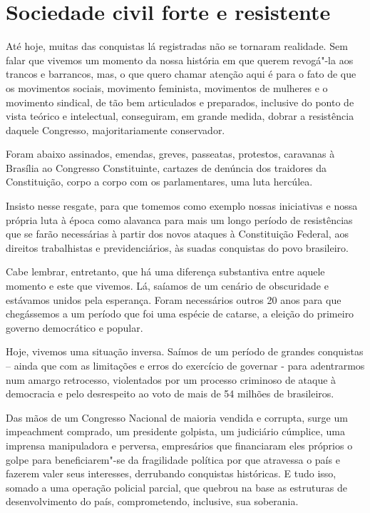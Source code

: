 \section{Sociedade civil forte e resistente}

Até hoje, muitas das conquistas lá registradas não se tornaram
realidade. Sem falar que vivemos um momento da nossa história em que
querem revogá"-la aos trancos e barrancos, mas, o que quero chamar
atenção aqui é para o fato de que os movimentos sociais, movimento
feminista, movimentos de mulheres e o movimento sindical, de tão bem
articulados e preparados, inclusive do ponto de vista teórico e
intelectual, conseguiram, em grande medida, dobrar a resistência daquele
Congresso, majoritariamente conservador.

Foram abaixo assinados, emendas, greves, passeatas, protestos, caravanas
à Brasília ao Congresso Constituinte, cartazes de denúncia dos traidores
da Constituição, corpo a corpo com os parlamentares, uma luta hercúlea.

Insisto nesse resgate, para que tomemos como exemplo nossas iniciativas
e nossa própria luta à época como alavanca para mais um longo período de
resistências que se farão necessárias à partir dos novos ataques à
Constituição Federal, aos direitos trabalhistas e previdenciários, às
suadas conquistas do povo brasileiro.

Cabe lembrar, entretanto, que há uma diferença substantiva entre aquele
momento e este que vivemos. Lá, saíamos de um cenário de obscuridade e
estávamos unidos pela esperança. Foram necessários outros 20 anos para
que chegássemos a um período que foi uma espécie de catarse, a eleição
do primeiro governo democrático e popular.

Hoje, vivemos uma situação inversa. Saímos de um período de grandes
conquistas -- ainda que com as limitações e erros do exercício de
governar - para adentrarmos num amargo retrocesso, violentados por um
processo criminoso de ataque à democracia e pelo desrespeito ao voto de
mais de 54 milhões de brasileiros.

Das mãos de um Congresso Nacional de maioria vendida e corrupta, surge
um impeachment comprado, um presidente golpista, um judiciário cúmplice,
uma imprensa manipuladora e perversa, empresários que financiaram eles
próprios o golpe para beneficiarem"-se da fragilidade política por que
atravessa o país e fazerem valer seus interesses, derrubando conquistas
históricas. E tudo isso, somado a uma operação policial parcial, que
quebrou na base as estruturas de desenvolvimento do país, comprometendo,
inclusive, sua soberania.

